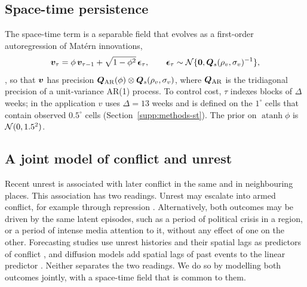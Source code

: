 \subsection{Space-time persistence}\label{sec:methods-st}

The space-time term is a separable field that evolves as a first-order
autoregression of Mat\'ern innovations,
\[
\bm{v}_\tau = \phi\, \bm{v}_{\tau-1} + \sqrt{1-\phi^2}\,\bm{\epsilon}_\tau,
\qquad \bm{\epsilon}_\tau \sim \mathcal{N}\{\bm{0}, \bm{Q}_s(\rho_v, \sigma_v)^{-1}\},
\]
\citep{cameletti2013pm10}, so that $\bm{v}$ has precision
$\bm{Q}_{\mathrm{AR}}(\phi) \otimes \bm{Q}_s(\rho_v,\sigma_v)$, where
$\bm{Q}_{\mathrm{AR}}$ is the tridiagonal precision of a unit-variance AR(1) process.
To control cost, $\tau$ indexes blocks of $\Delta$ weeks; in the application $v$ uses
$\Delta = 13$ weeks and is defined on the $1^\circ$ cells that contain observed
$0.5^\circ$ cells (Section~\ref{supp:methods-st}). The prior on
$\operatorname{atanh}\phi$ is $\mathcal{N}(0, 1.5^2)$.

\subsection{A joint model of conflict and unrest}\label{sec:methods-joint}

Recent unrest is associated with later conflict in the same and in neighbouring
places. This association has two readings. Unrest may escalate into armed conflict,
for example through repression \citep{ritter2016preventing, rod2023protest, ryckman2020turn,
chenoweth2017violent}. Alternatively, both outcomes may be driven by the same latent
episodes, such as a period of political crisis in a region, or a period of intense
media attention to it, without any effect of one on the other. Forecasting studies
use unrest histories and their spatial lags as predictors of conflict
\citep{rod2025predicting}, and diffusion models add spatial lags of past events to the
linear predictor \citep{racek2025diffusion}. Neither separates the two readings. We do
so by modelling both outcomes jointly, with a space-time field that is common to them.

